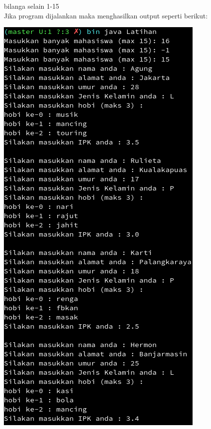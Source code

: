 \documentclass[a4paper,12pt]{article}
\begin{document}
bilanga selain 1-15\\
Jika program dijalankan maka menghasilkan output seperti berikut:
\begin{center}
    \includegraphics[scale=.7]{lat1.png} 

\end{center}
\end{document}
